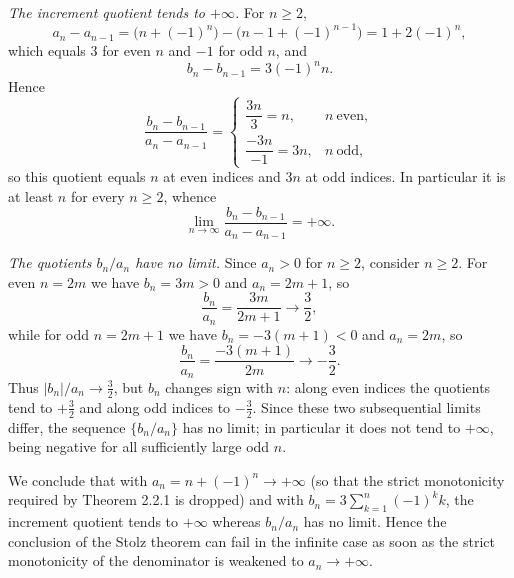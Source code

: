 \documentclass[11pt,a4paper]{article}
\newenvironment{solution}[1]{%
  \par\addvspace{1.7ex}%
  \noindent{\color{solutioncolor}\textbf{#1}}\hspace{0.55em}\ignorespaces}%
  {\par\addvspace{0.9ex}}
\begin{document}
\begin{solution}{Solution 2.2.2}
\begin{enumerate}[(i)]
\emph{The increment quotient tends to $+\infty$.} For $n\ge2$,
\[
a_n-a_{n-1}=\bigl(n+(-1)^n\bigr)-\bigl(n-1+(-1)^{n-1}\bigr)=1+2(-1)^n,
\]
which equals $3$ for even $n$ and $-1$ for odd $n$, and
\[
b_n-b_{n-1}=3(-1)^n n .
\]
Hence
\[
\frac{b_n-b_{n-1}}{a_n-a_{n-1}}=
\begin{cases}
\dfrac{3n}{3}=n, & n\ \text{even},\\[2ex]
\dfrac{-3n}{-1}=3n, & n\ \text{odd},
\end{cases}
\]
so this quotient equals $n$ at even indices and $3n$ at odd indices. In particular it is at least $n$ for every $n\ge2$, whence
\[
\lim_{n\to\infty}\frac{b_n-b_{n-1}}{a_n-a_{n-1}}=+\infty .
\]

\emph{The quotients $b_n/a_n$ have no limit.} Since $a_n>0$ for $n\ge2$, consider $n\ge2$. For even $n=2m$ we have $b_n=3m>0$ and $a_n=2m+1$, so
\[
\frac{b_n}{a_n}=\frac{3m}{2m+1}\longrightarrow\frac{3}{2},
\]
while for odd $n=2m+1$ we have $b_n=-3(m+1)<0$ and $a_n=2m$, so
\[
\frac{b_n}{a_n}=\frac{-3(m+1)}{2m}\longrightarrow-\frac{3}{2}.
\]
Thus $|b_n|/a_n\to\frac32$, but $b_n$ changes sign with $n$: along even indices the quotients tend to $+\frac32$ and along odd indices to $-\frac32$. Since these two subsequential limits differ, the sequence $\{b_n/a_n\}$ has no limit; in particular it does not tend to $+\infty$, being negative for all sufficiently large odd $n$.

We conclude that with $a_n=n+(-1)^n\to+\infty$ (so that the strict monotonicity required by Theorem 2.2.1 is dropped) and with $b_n=3\sum_{k=1}^{n}(-1)^k k$, the increment quotient tends to $+\infty$ whereas $b_n/a_n$ has no limit. Hence the conclusion of the Stolz theorem can fail in the infinite case as soon as the strict monotonicity of the denominator is weakened to $a_n\to+\infty$.
\end{enumerate}
\end{solution}
\end{document}
